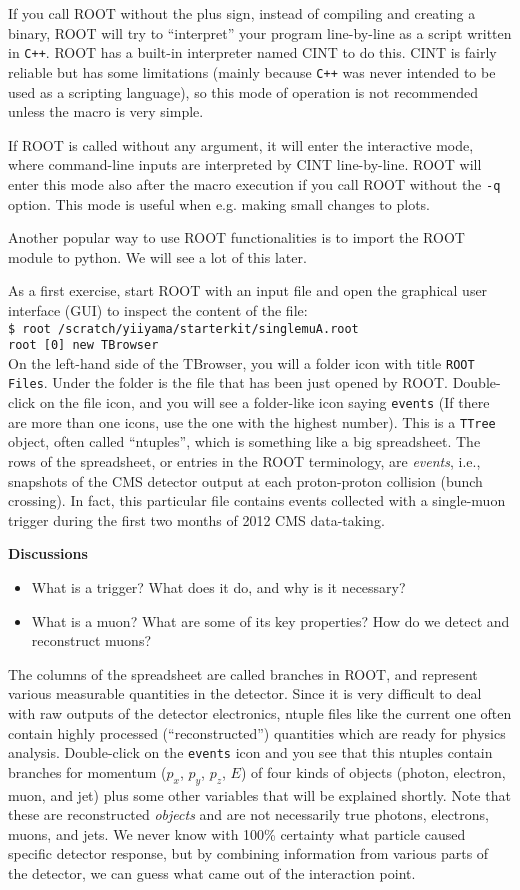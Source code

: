 \documentclass[12pt]{article}
\newcommand{\cpp}{\texttt{C++}\xspace}
\newcommand{\terminal}[1]{\vspace{3pt}\texttt{\$ #1} \\}
\newcommand{\rterminal}[2]{\vspace{3pt}\texttt{root [#1] #2} \\}
\newenvironment{discussions}{%
\vspace{0.2in}%
\textbf{Discussions}%
\begin{itemize}%
}{%
\end{itemize}%
}
\begin{document}
If you call ROOT without the plus sign, instead of compiling and creating a binary, ROOT will try to ``interpret'' your program line-by-line as a script written in \cpp. ROOT has a built-in interpreter named CINT to do this. CINT is fairly reliable but has some limitations (mainly because \cpp was never intended to be used as a scripting language), so this mode of operation is not recommended unless the macro is very simple.

If ROOT is called without any argument, it will enter the interactive mode, where command-line inputs are interpreted by CINT line-by-line. ROOT will enter this mode also after the macro execution if you call ROOT without the \texttt{-q} option. This mode is useful when e.g. making small changes to plots.

Another popular way to use ROOT functionalities is to import the ROOT module to python. We will see a lot of this later.

As a first exercise, start ROOT with an input file and open the graphical user interface (GUI) to inspect the content of the file: \\
\terminal{root /scratch/yiiyama/starterkit/singlemuA.root}
\rterminal{0}{new TBrowser}
On the left-hand side of the TBrowser, you will a folder icon with title \texttt{ROOT Files}. Under the folder is the file that has been just opened by ROOT. Double-click on the file icon, and you will see a folder-like icon saying \texttt{events} (If there are more than one icons, use the one with the highest number). This is a \texttt{TTree} object, often called ``ntuples'', which is something like a big spreadsheet. The rows of the spreadsheet, or entries in the ROOT terminology, are \textit{events}, i.e., snapshots of the CMS detector output at each proton-proton collision (bunch crossing). In fact, this particular file contains events collected with a single-muon trigger during the first two months of 2012 CMS data-taking.

\begin{discussions}
\item What is a trigger? What does it do, and why is it necessary?
\item What is a muon? What are some of its key properties? How do we detect and reconstruct muons?
\end{discussions}

The columns of the spreadsheet are called branches in ROOT, and represent various measurable quantities in the detector. Since it is very difficult to deal with raw outputs of the detector electronics, ntuple files like the current one often contain highly processed (``reconstructed'') quantities which are ready for physics analysis. Double-click on the \texttt{events} icon and you see that this ntuples contain branches for momentum ($p_{x}$, $p_{y}$, $p_{z}$, $E$) of four kinds of objects (photon, electron, muon, and jet) plus some other variables that will be explained shortly. Note that these are reconstructed \textit{objects} and are not necessarily true photons, electrons, muons, and jets. We never know with 100\% certainty what particle caused specific detector response, but by combining information from various parts of the detector, we can guess what came out of the interaction point.
\end{document}

